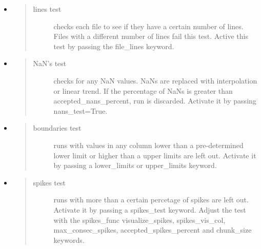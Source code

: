 \documentclass[a4paper,10pt,oneside]{sphinxmanual}
\begin{document}
\begin{fulllineitems}
\begin{itemize}
\item {} \begin{quote}\begin{description}
\item[{lines test}] \leavevmode
checks each file to see if they have a certain number of lines. Files with a different number of lines
fail this test. Active this test by passing the file\_lines keyword.

\end{description}\end{quote}

\end{itemize}
\begin{itemize}
\item {} \begin{quote}\begin{description}
\item[{NaN's test}] \leavevmode
checks for any NaN values. NaNs are replaced with interpolation or linear trend. If the percentage
of NaNs is greater than accepted\_nans\_percent, run is discarded. Activate it by passing nans\_test=True.

\end{description}\end{quote}

\item {} \begin{quote}\begin{description}
\item[{boundaries test}] \leavevmode
runs with values in any column lower than a pre-determined lower limit or higher
than a upper limits are left out. Activate it by passing a lower\_limits or upper\_limits keyword.

\end{description}\end{quote}

\item {} \begin{quote}\begin{description}
\item[{spikes test}] \leavevmode
runs with more than a certain percetage of spikes are left out.
Activate it by passing a spikes\_test keyword. Adjust the test with the spikes\_func
visualize\_spikes, spikes\_vis\_col, max\_consec\_spikes, accepted\_spikes\_percent and chunk\_size keywords.

\end{description}\end{quote}


\end{itemize}
\end{fulllineitems}
\end{document}
